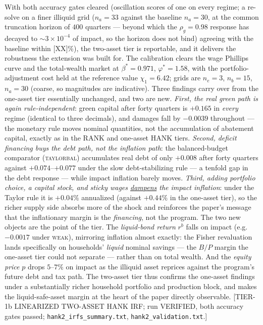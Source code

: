 With both accuracy gates cleared (oscillation scores of one on every
regime; a re-solve on a finer illiquid grid ($n_a=33$ against the baseline
$n_a=30$, at the common truncation horizon of $400$ quarters --- beyond
which the $\rho_g=0.98$ response has decayed to $\sim\!3\times10^{-4}$ of
impact, so the horizon does not bind) agreeing with the baseline within
[XX]\%), the two-asset tier is
reportable, and it delivers the robustness the extension was built for.
The calibration clears the wage Phillips curve and the total-wealth market
at $\beta^{*}=0.971$, $\varphi^{*}=1.58$, with the portfolio-adjustment
cost held at the reference value $\chi_1=6.42$; grids are $n_e=3$,
$n_b=15$, $n_a=30$ (coarse, so magnitudes are indicative). Three findings
carry over from the one-asset tier essentially unchanged, and two are new.
\emph{First, the real green path is again rule-independent}: green capital
after forty quarters is $+0.165$ in \emph{every} regime (identical to
three decimals), and damages fall by $-0.0039$ throughout --- the monetary
rule moves nominal quantities, not the accumulation of abatement capital,
exactly as in the RANK and one-asset HANK tiers. \emph{Second, deficit
financing buys the debt path, not the inflation path}: the balanced-budget
comparator (\textsc{taylorbal}) accumulates real debt of only $+0.008$
after forty quarters against $+0.074$--$+0.077$ under the slow
debt-stabilizing rule --- a tenfold gap in the debt response --- while
impact inflation barely moves. \emph{Third, adding portfolio choice, a
capital stock, and sticky wages \underline{dampens} the impact inflation}:
under the Taylor rule it is $+0.04\%$ annualized (against $+0.44\%$ in the
one-asset tier), so the richer supply side absorbs more of the shock and
reinforces the paper's message that the inflationary margin is the
\emph{financing}, not the program. The two new objects are the point of
the tier. The \emph{liquid-bond return} $r^b$ falls on impact (e.g.\
$-0.0017$ under \textsc{weak}), mirroring inflation almost exactly: the
Fisher revaluation lands specifically on households' \emph{liquid} nominal
savings --- the $B/P$ margin the one-asset tier could not separate ---
rather than on total wealth. And the \emph{equity price} $p$ drops
$5$--$7\%$ on impact as the illiquid asset reprices against the program's
future debt and tax path. The two-asset tier thus confirms the one-asset
findings under a substantially richer household portfolio and production
block, and makes the liquid-safe-asset margin at the heart of the paper
directly observable. [TIER-1b LINEARIZED TWO-ASSET HANK IRF; run VERIFIED,
both accuracy gates passed; \texttt{hank2\_irfs\_summary.txt},
\texttt{hank2\_validation.txt}.]

